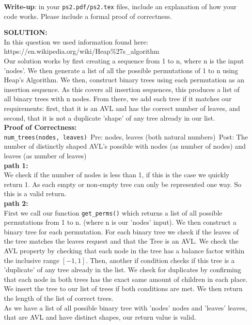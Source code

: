 \documentclass{assignment-263}
\begin{document}
\begin{enumerate}
\textbf{Write-up}: in your \verb|ps2.pdf/ps2.tex| files, include an explanation of how your code works. 
Please include a formal proof of correctness.



\textbf{SOLUTION:}\\

In this question we used information found here: https://en.wikipedia.org/wiki/Heap\%27s\_algorithm\\


	Our solution works by first creating a sequence from 1 to n, where n is the input 'nodes'. We then generate a list of all the possible permutations of 1 to n using Heap's Algorithm. We then, construct binary trees using each permutation as an insertion sequence. As this covers all insertion sequences, this produces a list of all binary trees with n nodes. From there, we add each tree if it matches our requirements: first, that it is an AVL and has the correct number of leaves, and second, that it is not a duplicate 'shape' of any tree already in our list.\\

\textbf{Proof of Correctness:}\\
\verb|num_trees(nodes, leaves)|\
Pre: nodes, leaves (both natural numbers)\
Post: The number of distinctly shaped AVL's possible with nodes (as number of nodes) and leaves (as number of leaves)\\
\textbf{path 1:}\\
     We check if the number of nodes is less than 1, if this is the case we quickly return 1. As each empty or non-empty tree can only be represented one way. So this is a valid return.\\
\textbf{path 2:}\\
     First we call our function \verb|get_perms()| which returns a list of all possible permutations from 1 to n. (where n is our 'nodes' input). We then construct a binary tree for each permutation. For each binary tree we check if the leaves of the tree matches the leaves request and that the Tree is an AVL. We check the AVL property by checking that each node in the tree has a balance factor within the inclusive range $[-1, 1]$. Then, another if condition checks if this tree is a 'duplicate' of any tree already in the list. We check for duplicates by confirming that each node in both trees has the exact same amount of children in each place. We insert the tree to our list of trees if both conditions are met. We then return the length of the list of correct trees.\\
As we have a list of all possible binary tree with 'nodes' nodes and 'leaves' leaves, that are AVL and have distinct shapes, our return value is valid.


\end{enumerate}
\end{document}
